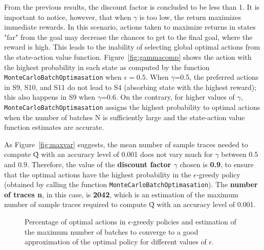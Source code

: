 \documentclass[10pt]{article}   	%
\begin{document}
From the previous results, the discount factor is concluded to be less than 1. It is important to notice, however, that when $\gamma$ is too low, the return maximizes immediate rewards. In this scenario, actions taken to maximize returns in states "far" from the goal may decrease the chances to get to the final goal, where the reward is high. This leads to the inability of selecting global optimal actions from the state-action value function. Figure~\ref{fig:gammacomp} shows the action with the highest probability in each state as computed by the function \texttt{MonteCarloBatchOptimasation} when $\epsilon=0.5$. When $\gamma$=0.5, the preferred actions in S9, S10, and S11 do not lead to S4 (absorbing state with the highest reward); this also happens in S9 when $\gamma$=0.6. On the contrary, for higher values of $\gamma$, \texttt{MonteCarloBatchOptimasation} assigns the highest probability to optimal actions when the number of batches N is sufficiently large and the state-action value function estimates are accurate.

As Figure~\ref{fig:maxvar} suggests, the mean number of sample traces needed to compute  \^{Q} with an accuracy level of 0.001 does not vary much for $\gamma$ between 0.5 and 0.9. Therefore, the value of the \textbf{discount factor $\gamma$} chosen is \textbf{0.9}, to ensure that the optimal actions have the highest probability in the $\epsilon$-greedy policy (obtained by calling the function \texttt{MonteCarloBatchOptimasation}). The \textbf{number of traces n}, in this case, is \textbf{2042}, which is an estimation of the maximum number of sample traces required to compute  \^{Q} with an accuracy level of 0.001.

\begin{figure}
\centering
\setlength\fboxsep{0pt}
\setlength\fboxrule{0.5pt}
\caption{Percentage of optimal actions in  $\epsilon$-greedy policies  and estimation of the maximum number of batches to converge to a good approximation of the optimal policy for different values of $\epsilon$. \label{fig:epsilon}}
\end{figure}
\end{document}
